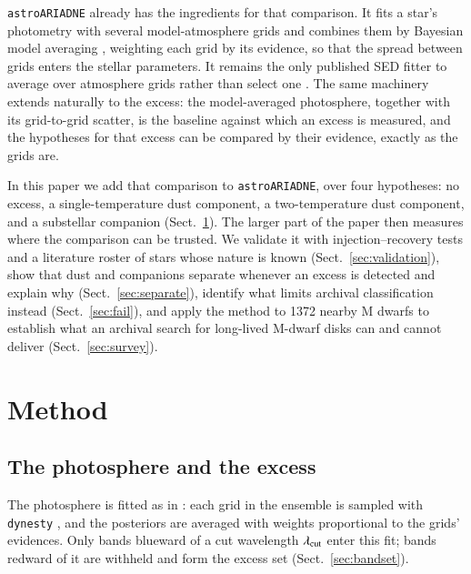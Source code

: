 \documentclass{aa}
\newcommand{\ariadne}{\texttt{astroARIADNE}}
\begin{document}
\ariadne{} \citep{vines2022} already has the ingredients for that comparison. It
fits a star's photometry with several model-atmosphere grids and combines them by
Bayesian model averaging \citep{hoeting1999}, weighting each grid by its evidence,
so that the spread between grids enters the stellar parameters. It remains the
only published SED fitter to average over atmosphere grids rather than select one
\citep[cf.][]{andrae2023,mcdonald2024}. The same machinery extends naturally to
the excess: the model-averaged photosphere, together with its grid-to-grid
scatter, is the baseline against which an excess is measured, and the hypotheses
for that excess can be compared by their evidence, exactly as the grids are.

In this paper we add that comparison to \ariadne{}, over four hypotheses: no
excess, a single-temperature dust component, a two-temperature dust component, and
a substellar companion (Sect.~\ref{sec:method}). The larger part of the paper then
measures where the comparison can be trusted. We validate it with \nInj{}
injection--recovery tests and a literature roster of stars whose nature is known
(Sect.~\ref{sec:validation}), show that dust and companions separate whenever an
excess is detected and explain why (Sect.~\ref{sec:separate}), identify what
limits archival classification instead (Sect.~\ref{sec:fail}), and apply the
method to 1372 nearby M dwarfs to establish what an archival search for
long-lived M-dwarf disks can and cannot deliver (Sect.~\ref{sec:survey}).


\section{Method}
\label{sec:method}

\subsection{The photosphere and the excess}
\label{sec:excess}

The photosphere is fitted as in \citet{vines2022}: each grid in the ensemble is
sampled with \texttt{dynesty} \citep{speagle2020}, and the posteriors are averaged
with weights proportional to the grids' evidences. Only bands blueward of a cut
wavelength $\lambda_{\rm cut}$ enter this fit; bands redward of it are withheld
and form the excess set (Sect.~\ref{sec:bandset}).
\end{document}
